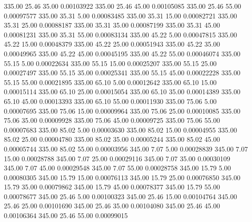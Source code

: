     335.00     25.46     35.00     0.00103922
    335.00     25.46     45.00     0.00105085
    335.00     25.46     55.00     0.00097577
    335.00     35.31      5.00     0.00083485
    335.00     35.31     15.00     0.00082721
    335.00     35.31     25.00     0.00088187
    335.00     35.31     35.00     0.00087199
    335.00     35.31     45.00     0.00081231
    335.00     35.31     55.00     0.00083134
    335.00     45.22      5.00     0.00047815
    335.00     45.22     15.00     0.00048379
    335.00     45.22     25.00     0.00051943
    335.00     45.22     35.00     0.00049965
    335.00     45.22     45.00     0.00045195
    335.00     45.22     55.00     0.00046074
    335.00     55.15      5.00     0.00022634
    335.00     55.15     15.00     0.00025207
    335.00     55.15     25.00     0.00027497
    335.00     55.15     35.00     0.00025341
    335.00     55.15     45.00     0.00022228
    335.00     55.15     55.00     0.00021895
    335.00     65.10      5.00     0.00012642
    335.00     65.10     15.00     0.00015114
    335.00     65.10     25.00     0.00015054
    335.00     65.10     35.00     0.00014389
    335.00     65.10     45.00     0.00013393
    335.00     65.10     55.00     0.00011930
    335.00     75.06      5.00     0.00007695
    335.00     75.06     15.00     0.00009964
    335.00     75.06     25.00     0.00010085
    335.00     75.06     35.00     0.00009928
    335.00     75.06     45.00     0.00009725
    335.00     75.06     55.00     0.00007683
    335.00     85.02      5.00     0.00003630
    335.00     85.02     15.00     0.00004955
    335.00     85.02     25.00     0.00004780
    335.00     85.02     35.00     0.00005244
    335.00     85.02     45.00     0.00005744
    335.00     85.02     55.00     0.00003956
    345.00      7.07      5.00     0.00028839
    345.00      7.07     15.00     0.00028788
    345.00      7.07     25.00     0.00029116
    345.00      7.07     35.00     0.00030109
    345.00      7.07     45.00     0.00029548
    345.00      7.07     55.00     0.00028758
    345.00     15.79      5.00     0.00080305
    345.00     15.79     15.00     0.00076113
    345.00     15.79     25.00     0.00076850
    345.00     15.79     35.00     0.00079862
    345.00     15.79     45.00     0.00078377
    345.00     15.79     55.00     0.00078677
    345.00     25.46      5.00     0.00100323
    345.00     25.46     15.00     0.00104764
    345.00     25.46     25.00     0.00101690
    345.00     25.46     35.00     0.00104080
    345.00     25.46     45.00     0.00106364
    345.00     25.46     55.00     0.00099015
